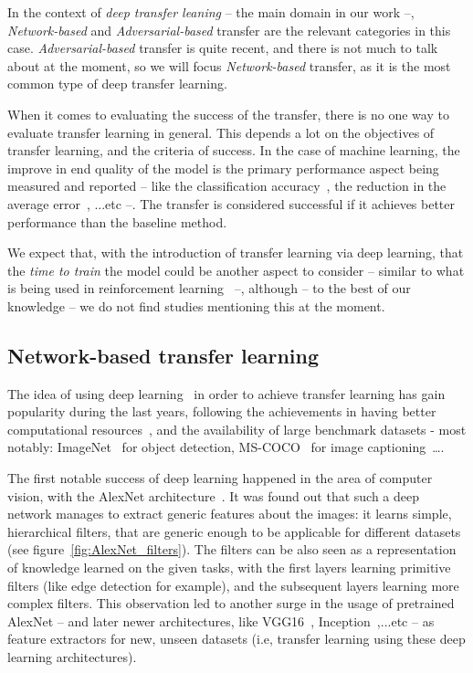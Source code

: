   \par In the context of \textit{deep transfer leaning} -- the main domain in our work --, \textit{Network-based} and \textit{Adversarial-based} transfer are the relevant categories in this case. \textit{Adversarial-based} transfer is quite recent, and there is not much to talk about at the moment, so we will focus \textit{Network-based} transfer, as it is the most common type of deep transfer learning.

  \par When it comes to evaluating the success of the transfer, there is no one way to evaluate transfer learning in general. This depends a lot on the objectives of transfer learning, and the criteria of success. In the case of machine learning, the improve in end quality of the model is the primary performance aspect being measured and reported -- like the classification accuracy~\citep{chattopadhyay2012multisource,long2013transfer,pan2010cross,glorot2011domain}, the reduction in the average error~\citep{pan2010domain}, ...etc --. The transfer is considered successful if it achieves better performance than the baseline method.

  \par We expect that, with the introduction of transfer learning via deep learning, that the \textit{time to train} the model could be another aspect to consider -- similar to what is being used in reinforcement learning~\citep{taylor2007cross} --, although -- to the best of our knowledge -- we do not find studies mentioning this at the moment.

  \subsection{Network-based transfer learning}
    \par The idea of using deep learning~\citep{lecun2015deep} in order to achieve transfer learning has gain popularity during the last years, following the achievements in having better computational resources~\citep{raina2009large}, and the availability of large benchmark datasets - most notably: ImageNet~\citep{imagenet_cvpr09} for object detection, MS-COCO~\citep{2014arXiv1405.0312L} for image captioning~\ldots.

    \par The first notable success of deep learning happened in the area of computer vision, with the AlexNet architecture~\citep{krizhevsky2012imagenet}. It was found out that such a deep network manages to extract generic features about the images: it learns simple, hierarchical filters, that are generic enough to be applicable for different datasets (see figure~\ref{fig:AlexNet_filters}). The filters can be also seen as a representation of knowledge learned on the given tasks, with the first layers learning primitive filters (like edge detection for example), and the subsequent layers learning more complex filters. This observation led to another surge in the usage of pretrained AlexNet -- and later newer architectures, like VGG16~\citep{simonyan2014very}, Inception~\citep{szegedy2015going},...etc -- as feature extractors for new, unseen datasets (i.e, transfer learning using these deep learning architectures).

